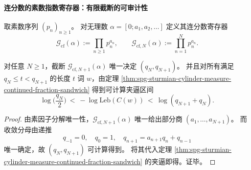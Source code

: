 \paragraph{连分数的素数指数寄存器：有限截断的可审计性}\label{par:spg-continued-fraction-prime-ledger}
取素数序列 \((p_n)_{n\ge 1}\)。
对无理数 \(\alpha=[0;a_1,a_2,\dots]\) 定义其连分数寄存器
\[
\mathcal{G}_{\mathrm{cf}}(\alpha):=\prod_{n\ge 1}p_n^{a_n},
\qquad
\mathcal{G}_{\mathrm{cf},N}(\alpha):=\prod_{n=1}^{N}p_n^{a_n}.
\]
\begin{proposition}[有限截断决定收敛分母并给出信息时间夹逼区间]\label{prop:spg-continued-fraction-ledger-determines-cylinder-time-window}
对任意 \(N\ge 1\)，截断 \(\mathcal{G}_{\mathrm{cf},N+1}(\alpha)\) 唯一决定 \((q_N,q_{N+1})\)。
并且对所有满足 \(q_N\le t<q_{N+1}\) 的长度 \(t\) 词 \(w\)，由定理 \ref{thm:spg-sturmian-cylinder-measure-continued-fraction-sandwich} 得到可计算夹逼区间
\[
\log\!\Big(\frac{q_N}{2}\Big)\ <\ -\log \mathrm{Leb}(C(w))\ <\ \log(q_{N+1}+q_N).
\]
\end{proposition}
\begin{proof}
由素因子分解唯一性，\(\mathcal{G}_{\mathrm{cf},N+1}(\alpha)\) 唯一给出部分商 \((a_1,\dots,a_{N+1})\)。
而收敛分母由递推
\[
q_{-1}=0,\quad q_0=1,\quad q_{n+1}=a_{n+1}q_n+q_{n-1}
\]
唯一确定，故 \((q_N,q_{N+1})\) 可计算得到。
将其代入定理 \ref{thm:spg-sturmian-cylinder-measure-continued-fraction-sandwich} 的夹逼即得。证毕。
\end{proof}



\endinput
